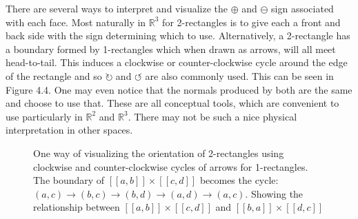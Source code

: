 There are several ways to interpret and visualize the $\oplus$ and $\ominus$ sign associated with each face.
Most naturally in $\mathbb{R}^3$ for 2-rectangles is to give each a front and back side with the sign determining which to use.
Alternatively, a 2-rectangle has a boundary formed by 1-rectangles which when drawn as arrows, will all meet head-to-tail.
This induces a clockwise or counter-clockwise cycle around the edge of the rectangle and so $\circlearrowright$ and $\circlearrowleft$ are also commonly used.
This can be seen in Figure 4.4.
One may even notice that the normals produced by both are the same and choose to use that.
These are all conceptual tools, which are convenient to use particularly in $\mathbb{R}^2$ and $\mathbb{R}^3$.
There may not be such a nice physical interpretation in other spaces.


\begin{figure}[ht]
\caption[Orientations of 2-rectangles]{One way of visualizing the orientation of 2-rectangles using clockwise and counter-clockwise cycles of arrows for 1-rectangles. 
The boundary of $[\![a,b]\!] \times [\![c,d]\!]$ becomes the cycle: 
$(a,c) \to (b,c) \to (b,d) \to (a,d) \to (a,c)$.
Showing the relationship between $[\![a,b]\!] \times [\![c,d]\!]$ and $[\![b,a]\!] \times [\![d,c]\!]$ }
\centering
{}
\end{figure}


